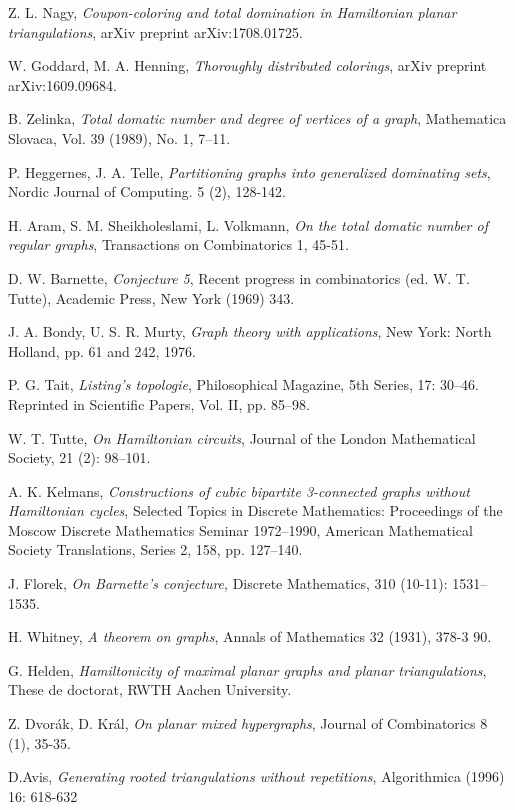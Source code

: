 \begin{thebibliography}{9}

Z. L. Nagy,
\textit{Coupon-coloring and total domination in Hamiltonian planar triangulations},
arXiv preprint arXiv:1708.01725.

W. Goddard, M. A. Henning,
\textit{Thoroughly distributed colorings},
arXiv preprint arXiv:1609.09684.

B. Zelinka,
\textit{Total domatic number and degree of vertices of a graph},
Mathematica Slovaca, Vol. 39 (1989), No. 1, 7--11.

P. Heggernes, J. A. Telle,
\textit{Partitioning graphs into generalized dominating sets},
Nordic Journal of Computing. 5 (2), 128-142.

H. Aram, S. M. Sheikholeslami, L. Volkmann,
\textit{On the total domatic number of regular graphs},
Transactions on Combinatorics 1, 45-51.

D. W. Barnette,
\textit{Conjecture 5},
Recent progress in combinatorics (ed. W. T. Tutte), Academic Press, New York (1969) 343.

J. A. Bondy, U. S. R. Murty,
\textit{Graph theory with applications},
New York: North Holland, pp. 61 and 242, 1976.

P. G. Tait,
\textit{Listing's topologie},
Philosophical Magazine, 5th Series, 17: 30–46. Reprinted in Scientific Papers, Vol. II, pp. 85–98.

W. T. Tutte,
\textit{On Hamiltonian circuits},
Journal of the London Mathematical Society, 21 (2): 98–101.

A. K. Kelmans,
\textit{Constructions of cubic bipartite 3-connected graphs without Hamiltonian cycles},
Selected Topics in Discrete Mathematics: Proceedings of the Moscow Discrete Mathematics Seminar 1972–1990,
American Mathematical Society Translations, Series 2, 158, pp. 127–140.

J. Florek,
\textit{On Barnette's conjecture},
Discrete Mathematics, 310 (10-11): 1531–1535.

H. Whitney,
\textit{A theorem on graphs},
Annals of Mathematics 32 (1931), 378-3 90.

G. Helden,
\textit{Hamiltonicity of maximal planar graphs and planar triangulations},
These de doctorat, RWTH Aachen University.

Z. Dvorák, D. Král,
\textit{On planar mixed hypergraphs},
Journal of Combinatorics 8 (1), 35-35.

D.Avis,
\textit{Generating rooted triangulations without repetitions},
Algorithmica (1996) 16: 618-632

\end{thebibliography}
